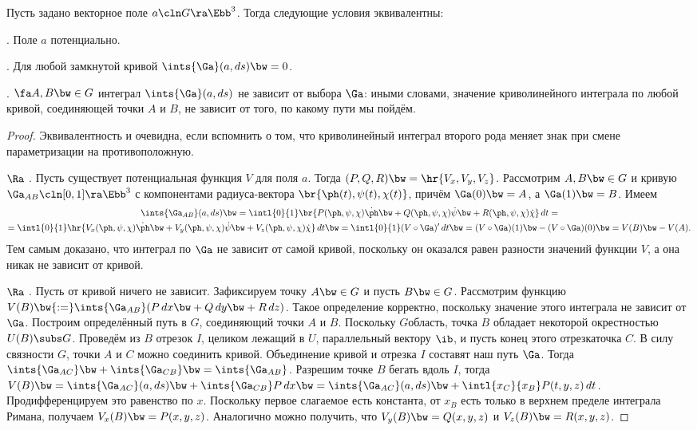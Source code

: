 \documentclass[a4paper]{article}
\begin{document}
\begin{theorem}
Пусть задано векторное поле $a\cln G\ra \Ebb^3$. Тогда следующие условия эквивалентны:

. Поле $a$ потенциально.

. Для любой замкнутой кривой $\ints{\Ga}(a,ds) \bw= 0$.

. $\fa A, B \bw\in G$ интеграл $\ints{\Ga}(a,ds)$ не зависит от выбора $\Ga$: иными словами,
значение криволинейного интеграла по любой кривой, соединяющей точки $A$ и $B$, не зависит от того, по какому
пути мы пойдём.
\end{theorem}
\begin{proof}
Эквивалентность  и  очевидна, если вспомнить о том, что криволинейный интеграл второго
рода меняет знак при смене параметризации на противоположную.

 $\Ra$ . Пусть существует потенциальная функция $V$ для поля $a$. Тогда
$(P, Q, R) \bw= \hr{V_x, V_y, V_z}$. Рассмотрим $A, B \bw\in G$ и кривую
$\Ga_{AB} \cln [0,1] \ra \Ebb^3$ с компонентами радиуса-вектора $\br{\ph(t), \psi(t),\chi(t)}$,
причём $\Ga(0) \bw= A$, а $\Ga(1) \bw= B$. Имеем
\begin{multline*}
\ints{\Ga_{AB}}(a, ds) \bw=
\intl{0}{1}\br{P(\ph,\psi,\chi)\dot{\ph} \bw+ Q(\ph,\psi,\chi)\dot{\psi} \bw+
               R(\ph,\psi,\chi)\dot{\chi}}\,d t =\\=
\intl{0}{1}\hr{V_x(\ph,\psi,\chi)\dot{\ph} \bw+ V_y(\ph,\psi,\chi)\dot{\psi} \bw+
               V_z(\ph,\psi,\chi)\dot{\chi}}\,d t\bw=
\intl{0}{1}(V\circ\Ga)'\,d t \bw= (V\circ\Ga)(1) \bw- (V\circ\Ga)(0) \bw= V(B)\bw-V(A).
\end{multline*}
Тем самым доказано,
что интеграл по $\Ga$ не зависит от самой кривой, поскольку он оказался равен разности значений функции $V$,
а она никак не зависит от кривой.

 $\Ra$ . Пусть от кривой ничего не зависит. Зафиксируем точку $A \bw\in G$ и пусть $B \bw\in G$.
Рассмотрим функцию $V(B) \bw{:=} \ints{\Ga_{AB}}(P\,d x \bw+ Q\,d y \bw+ R\,d z)$. Такое определение
корректно, поскольку значение этого интеграла не зависит от $\Ga$. Построим определённый путь в $G$,
соединяющий точки $A$ и $B$. Поскольку $G$\т область, точка $B$ обладает некоторой окрестностью $U(B) \subs
G$. Проведём из $B$ отрезок $I$, целиком лежащий в $U$, параллельный вектору $\ib$, и пусть конец этого
отрезка\т точка $C$. В силу связности $G$, точки $A$ и $C$ можно соединить кривой. Объединение кривой и
отрезка $I$ составят наш путь $\Ga$. Тогда $\ints{\Ga_{AC}} \bw+ \ints{\Ga_{CB}} \bw= \ints{\Ga_{AB}}$.
Разрешим точке $B$ бегать вдоль $I$, тогда $V(B) \bw= \ints{\Ga_{AC}}(a,d s) \bw+ \ints{\Ga_{CB}}P\,dx
\bw= \ints{\Ga_{AC}}(a,ds) \bw+ \intl{x_C}{x_B}P(t,y,z)\,dt$. Продифференцируем это равенство по $x$.
Поскольку первое слагаемое есть константа, от $x_B$ есть только в верхнем пределе интеграла Римана, получаем
$V_x(B) \bw= P(x,y,z)$. Аналогично можно получить, что $V_y(B) \bw= Q(x,y,z)$ и $V_z(B) \bw= R(x,y,z)$.
\end{proof}
\end{document}
